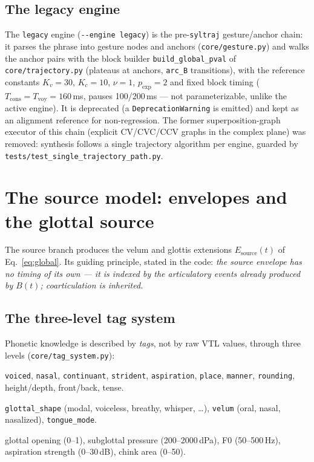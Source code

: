 \documentclass[11pt,a4paper]{article}
\begin{document}
\subsection{The legacy engine}

The \texttt{legacy} engine (\texttt{-{}-engine legacy}) is the
pre-\texttt{syltraj} gesture/anchor chain: it parses the phrase into
gesture nodes and anchors (\texttt{core/gesture.py}) and walks the
anchor pairs with the block builder \texttt{build\_global\_pval}
of \texttt{core/trajectory.py} (plateaus at anchors, \texttt{arc\_B}
transitions), with the reference constants \(K_v = 30\), \(K_c = 10\),
\(\nu = 1\), \(p_{\mathrm{exp}} = 2\) and fixed block timing
(\(T_{\mathrm{cons}} = T_{\mathrm{voy}} = 160\)\,ms, pauses 100/200\,ms
--- not parameterizable, unlike the active engine). It is deprecated
(a \texttt{DeprecationWarning} is emitted) and kept as an alignment
reference for non-regression. The former superposition-graph executor
of this chain (explicit CV/CVC/CCV graphs in the complex plane) was
removed: synthesis follows a single trajectory algorithm per engine,
guarded by \texttt{tests/test\_single\_trajectory\_path.py}.

\section{The source model: envelopes and the glottal source}\label{sec:source}

The source branch produces the velum and glottis extensions
\(E_{\mathrm{source}}(t)\) of Eq.~\eqref{eq:global}. Its guiding
principle, stated in the code: \emph{the source envelope has no timing of
its own --- it is indexed by the articulatory events already produced by
\(B(t)\); coarticulation is inherited.}

\subsection{The three-level tag system}\label{subsec:tags}

Phonetic knowledge is described by \emph{tags}, not by raw VTL values,
through three levels (\texttt{core/tag\_system.py}):

\begin{description}[leftmargin=2em]
\item[Level A --- phonetic tags:] \texttt{voiced}, \texttt{nasal},
      \texttt{continuant}, \texttt{strident}, \texttt{aspiration},
      \texttt{place}, \texttt{manner}, \texttt{rounding}, height/depth,
      front/back, tense.
\item[Level B --- articulatory tags:] \texttt{glottal\_shape} (modal,
      voiceless, breathy, whisper, \ldots), \texttt{velum} (oral, nasal,
      nasalized), \texttt{tongue\_mode}.
\item[Level C --- control tags:] glottal opening (0--1), subglottal
      pressure (200--2000\,dPa), F0 (50--500\,Hz), aspiration strength
      (0--30\,dB), chink area (0--50).
\end{description}
\end{document}
